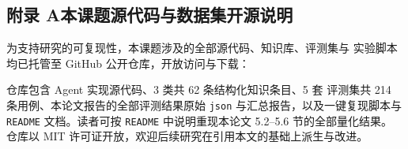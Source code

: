\documentclass[a4paper]{article}
\theoremstyle{definition}
\theoremstyle{plain}
\theoremstyle{remark}
\begin{document}
\subsection*{附录 A\quad 本课题源代码与数据集开源说明}

为支持研究的可复现性，本课题涉及的全部源代码、知识库、评测集与
实验脚本均已托管至 GitHub 公开仓库，开放访问与下载：

\begin{center}
\end{center}

仓库包含 Agent 实现源代码、3 类共 62 条结构化知识条目、5 套
评测集共 214 条用例、本论文报告的全部评测结果原始 \texttt{json}
与汇总报告，以及一键复现脚本与 \texttt{README} 文档。读者可按
\texttt{README} 中说明重现本论文 5.2--5.6 节的全部量化结果。
仓库以 MIT 许可证开放，欢迎后续研究在引用本文的基础上派生与改进。
\end{document}
